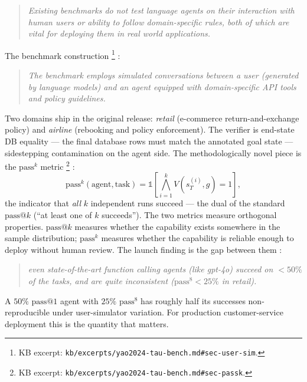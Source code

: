 \begin{quote}\itshape
Existing benchmarks do not test language agents on their interaction
with human users or ability to follow domain-specific rules, both of
which are vital for deploying them in real world applications.
\end{quote}

The benchmark construction%
\footnote{KB excerpt: \nolinkurl{kb/excerpts/yao2024-tau-bench.md#sec-user-sim}.}
\citep[\S{}sec-user-sim]{yao2024-tau-bench}:

\begin{quote}\itshape
The benchmark employs simulated conversations between a user
(generated by language models) and an agent equipped with
domain-specific API tools and policy guidelines.
\end{quote}

Two domains ship in the original release: \emph{retail} (e-commerce
return-and-exchange policy) and \emph{airline} (rebooking and
policy enforcement). The verifier is end-state DB equality --- the
final database rows must match the annotated goal state ---
sidestepping  contamination on the agent side. The
methodologically novel piece is the $\mathrm{pass}^k$ metric%
\footnote{KB excerpt: \nolinkurl{kb/excerpts/yao2024-tau-bench.md#sec-passk}.}
\citep[\S{}sec-passk]{yao2024-tau-bench}:
\[
\mathrm{pass}^k(\text{agent}, \text{task}) = \mathbb{1}\!\left[\bigwedge_{i=1}^{k} V(s_T^{(i)}, g) = 1\right],
\]
the indicator that \emph{all} $k$ independent runs succeed --- the
dual of the standard $\mathrm{pass}@k$ (``at least one of $k$
succeeds''). The two metrics measure orthogonal properties.
$\mathrm{pass}@k$ measures whether the capability exists somewhere in
the sample distribution; $\mathrm{pass}^k$ measures whether the
capability is reliable enough to deploy without human review.
The launch finding is the gap between them
\citep[\S{}sec-result]{yao2024-tau-bench}:

\begin{quote}\itshape
even state-of-the-art function calling agents (like gpt-4o) succeed
on $<50\%$ of the tasks, and are quite inconsistent ($\mathrm{pass}^8 < 25\%$
in retail).
\end{quote}

A $50\%$ $\mathrm{pass}@1$ agent with $25\%$ $\mathrm{pass}^8$ has
roughly half its successes non-reproducible under user-simulator
variation. For production customer-service deployment this is the
quantity that matters.

